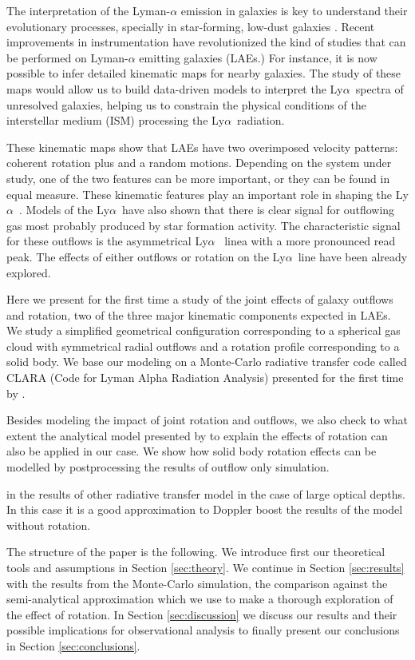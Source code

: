 \documentclass[a4paper,fleqn,usenatbib]{mnras}
\newcommand{\lya}{\ifmmode{{\rm Ly}\alpha}\else Ly$\alpha$\ \fi}
\begin{document}
The interpretation of the Lyman-$\alpha$ emission in galaxies is
key to understand their evolutionary processes, specially in
star-forming, low-dust galaxies \citep{PartridgePeebles}.
Recent improvements in instrumentation have revolutionized the kind of
studies that can be performed on Lyman-$\alpha$ emitting galaxies
(LAEs.)
For instance, it is now possible to infer detailed kinematic maps for
nearby galaxies. 
The study of these maps would allow us to build data-driven models to
interpret the \lya spectra of unresolved galaxies, helping us to
constrain the physical conditions of the interstellar medium (ISM)
processing the \lya radiation.

These kinematic maps show that LAEs have two  overimposed velocity
patterns: coherent rotation plus and a random motions.
Depending on the system under study, one of the two features can be
more important, or they can be found in equal measure.  
These kinematic features play an important role in shaping the \lya. 
Models of the \lya have also shown that there is clear signal for
outflowing gas most probably produced by star formation activity.
The characteristic signal for these outflows is the asymmetrical \lya
linea with a more pronounced read peak.
The effects of either outflows or rotation on the \lya line have been
already explored.

Here we present for the first time a study of the joint effects of
galaxy outflows and rotation, two of the three major kinematic
components expected in LAEs. 
We study a simplified geometrical configuration corresponding to a
spherical gas cloud with symmetrical radial outflows and a rotation
profile corresponding to a solid body.
We base our modeling on a Monte-Carlo radiative transfer code called
CLARA (Code for Lyman Alpha Radiation Analysis) presented for the
first time by \cite{CLARA}.

Besides modeling the impact of joint rotation and outflows, we also
check to what extent the analytical model presented by
\cite{Garavito14} to explain the effects of rotation can also be
applied in our case.
We show how solid body rotation effects can be modelled by
postprocessing the results of outflow only simulation. 

in the results of other radiative transfer model in the case of large
optical depths. 
In this case it is a good approximation to Doppler
boost the results of the model without rotation. 

The structure of the paper is the following. 
We introduce first our theoretical tools and assumptions
in Section \ref{sec:theory}. We continue in Section  \ref{sec:results}
with the results from the Monte-Carlo simulation, the comparison
against the semi-analytical approximation which we use to make a
thorough exploration of the effect of rotation.
In Section \ref{sec:discussion} we discuss our results and their
possible implications for observational analysis to finally present
our conclusions in Section \ref{sec:conclusions}.
\end{document}
